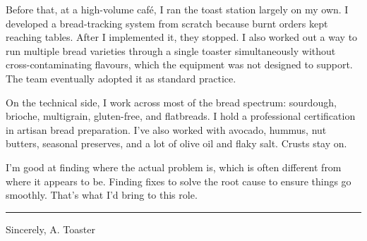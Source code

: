 \documentclass[letterpaper,11pt]{article}
\begin{document}
\noindent Before that, at a high-volume caf\'{e}, I ran the toast station largely on my own. I developed a bread-tracking system from scratch because burnt orders kept reaching tables. After I implemented it, they stopped. I also worked out a way to run multiple bread varieties through a single toaster simultaneously without cross-contaminating flavours, which the equipment was not designed to support. The team eventually adopted it as standard practice.

\noindent On the technical side, I work across most of the bread spectrum: sourdough, brioche, multigrain, gluten-free, and flatbreads. I hold a professional certification in artisan bread preparation. I've also worked with avocado, hummus, nut butters, seasonal preserves, and a lot of olive oil and flaky salt. Crusts stay on.

\noindent I'm good at finding where the actual problem is, which is often different from where it appears to be. Finding fixes to solve the root cause to ensure things go smoothly. That's what I'd bring to this role.

\vspace{2pt}
\noindent\color{black}\rule{\textwidth}{0.4pt}
\vspace{6pt}

\noindent Sincerely,
\noindent A. Toaster

\vfill\null

\end{document}
